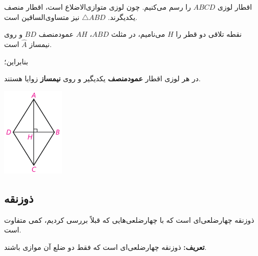 \documentclass[12pt, a4paper]{book}
\begin{document}
\begin{minipage}{.8\textwidth}
	اقطار لوزی
	$ABCD$
	را رسم می‌کنیم. چون لوزی متوازی‌الاضلاع است، اقطار منصف یکدیگرند. 
	$
	\triangle ABD
	$
	نیز متساوی‌الساقین است.
	
	نقطه تلاقی دو قطر را
	$H$
	می‌نامیم، در مثلث
	$ABD$،
	$AH$
	عمودمنصف
	$BD$
	و روی نیمساز 
	$
	\widehat{A}
	$
	است.
	
	بنابراین؛
	\newline \smallskip
	
	{\large در هر لوزی اقطار \textbf{عمودمنصف} یکدیگیر و روی \textbf{نیمساز} زوایا هستند.}
	
\end{minipage}
\begin{minipage}{.2\textwidth}
	\begin{flushleft}
		\includegraphics[width=3cm]{"Shapes/Fasl - 3/Dars 1/2-3.1.pdf"}
	\end{flushleft}
\end{minipage}
\newpage

\subsection{ذوزنقه}
ذوزنقه چهارضلعی‌ای است که با چهارضلعی‌هایی که قبلاً بررسی کردیم، کمی متفاوت است.

\textbf{تعریف:} ذوزنقه چهارضلعی‌ای است که فقط دو ضلع آن موازی باشند.
\end{document}
